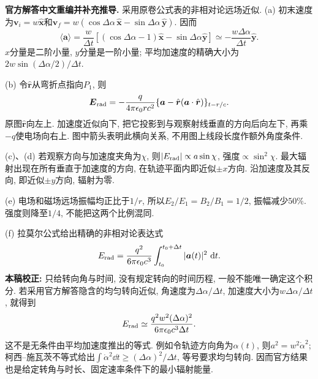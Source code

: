 \begin{solution}
\textbf{官方解答中文重编并补充推导.}
采用原卷公式表的非相对论远场近似.
(a) 初末速度为$\boldsymbol v_i=w\hat{\boldsymbol x}$和$\boldsymbol v_f=w(\cos\Delta\alpha\,\hat{\boldsymbol x}-\sin\Delta\alpha\,\hat{\boldsymbol y})$. 因而
\[
\langle\boldsymbol a\rangle=\frac w{\Delta t}
[(\cos\Delta\alpha-1)\hat{\boldsymbol x}-\sin\Delta\alpha\hat{\boldsymbol y}]
\simeq-\frac{w\Delta\alpha}{\Delta t}\hat{\boldsymbol y}.
\]
$x$分量是二阶小量, $y$分量是一阶小量; 平均加速度的精确大小为$2w\sin(\Delta\alpha/2)/\Delta t$.

(b) 令$\hat{\boldsymbol r}$从弯折点指向$P_1$, 则
\[
\boldsymbol E_{\rm rad}=-\frac q{4\pi\epsilon_0rc^2}
\{\boldsymbol a-\hat{\boldsymbol r}(\boldsymbol a\cdot\hat{\boldsymbol r})\}_{t-r/c}.
\]
原图$\hat{\boldsymbol r}$向左上. 加速度近似向下, 把它投影到与观察射线垂直的方向后向左下, 再乘$-q$使电场向右上. 图中箭头表明此横向关系, 不用图上线段长度作额外角度条件.

(c)、(d) 若观察方向与加速度夹角为$\chi$, 则$|E_{\rm rad}|\propto a\sin\chi$, 强度$\propto\sin^2\chi$. 最大辐射出现在所有垂直于加速度的方向, 在轨迹平面内即近似$\pm x$方向. 沿加速度及其反向, 即近似$\pm y$方向, 辐射为零.
\begin{center}
\end{center}
(e) 电场和磁场远场振幅均正比于$1/r$, 所以$E_2/E_1=B_2/B_1=1/2$, 振幅减少$50\%$. 强度则降至$1/4$, 不能把这两个比例混同.

(f) 拉莫尔公式给出精确的非相对论表达式
\[
E_{\rm rad}=\frac{q^2}{6\pi\epsilon_0c^3}\int_{t_0}^{t_0+\Delta t}|\boldsymbol a(t)|^2\,\,\mathrm d t.
\]
\textbf{本稿校正:} 只给转向角与时间, 没有规定转向的时间历程, 一般不能唯一确定这个积分. 若采用官方解答隐含的均匀转向近似, 角速度为$\Delta\alpha/\Delta t$, 加速度大小为$w\Delta\alpha/\Delta t$, 就得到
\[
E_{\rm rad}\simeq\frac{q^2w^2(\Delta\alpha)^2}{6\pi\epsilon_0c^3\Delta t}.
\]
这不是无条件由平均加速度推出的等式. 例如令轨迹方向角为$\alpha(t)$, 则$a^2=w^2\dot\alpha^2$; 柯西--施瓦茨不等式给出$\int\dot\alpha^2\dd t\ge(\Delta\alpha)^2/\Delta t$, 等号要求均匀转向. 因而官方结果也是给定转角与时长、固定速率条件下的最小辐射能量.
\end{solution}

